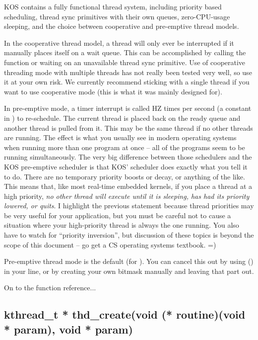 \documentclass[english]{report}
\begin{document}
KOS contains a fully functional thread system, including priority
based scheduling, thread sync primitives with their own queues, zero-CPU-usage
sleeping, and the choice between cooperative and pre-emptive thread
models.

In the cooperative thread model, a thread will only ever be interrupted
if it manually places itself on a wait queue. This can be accomplished
by calling the  function or waiting on an unavailable
thread sync primitive. Use of cooperative threading mode with multiple
threads has not really been tested very well, so use it at your own
risk. We currently recommend sticking with a single thread if you
want to use cooperative mode (this is what it was mainly designed
for).

In pre-emptive mode, a timer interrupt is called HZ times per second
(a constant in ) to re-schedule. The current thread is placed
back on the ready queue and another thread is pulled from it. This
may be the same thread if no other threads are running. The effect
is what you usually see in modern operating systems when running more
than one program at once -- all of the programs seem to be running
simultaneously. The very big difference between those schedulers and
the KOS pre-emptive scheduler is that KOS' scheduler does exactly
what you tell it to do. There are no temporary priority boosts or
decay, or anything of the like. This means that, like most real-time
embedded kernels, if you place a thread at a high priority, \emph{no
other thread will execute until it is sleeping, has had its priority
lowered, or quits}. I highlight the previous statement because thread
priorities may be very useful for your application, but you must be
careful not to cause a situation where your high-priority thread is
always the one running. You also have to watch for ``priority inversion'',
but discussion of these topics is beyond the scope of this document
-- go get a CS operating systems textbook. =)

Pre-emptive thread mode is the default (for ). You can
cancel this out by using ()
in your  line, or by creating your own bitmask manually
and leaving that part out.

On to the function reference...


\subsection{kthread\_t * thd\_create(void (* routine)(void * param), void * param)}
\end{document}
